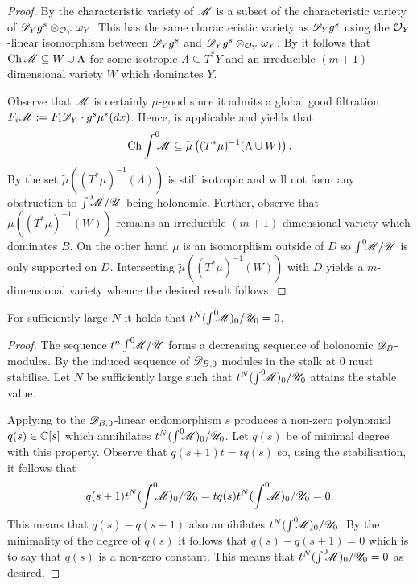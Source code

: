 \begin{proof}
  By  the characteristic variety of $\mathscr{M}$ is a subset of the characteristic variety of $\mathscr{D}_Yg^s \otimes_{\mathcal{O}_Y} \omega_Y$.
  This has the same characteristic variety as $\mathscr{D}_Y g^s$ using the $\mathcal{O}_Y$-linear isomorphism between $\mathscr{D}_Yg^s$ and $\mathscr{D}_Yg^s \otimes_{\mathcal{O}_Y} \omega_Y$.
  By  it follows that $\operatorname{Ch} \mathscr{M} \subseteq W \cup \Lambda$ for some isotropic $\Lambda\subseteq T^*Y$ and an irreducible $(m+1)$-dimensional variety $W$ which dominates $Y$.

  Observe that $\mathscr{M}$ is certainly $\mu$-good since it admits a global good filtration $F_i\mathscr{M} := F_i\mathscr{D}_Y \cdot g^s \mu^*(dx)$.
  Hence,  is applicable and yields that
  $$\operatorname{Ch} \int^0 \mkern -8mu \mathscr{M} \subseteq \widetilde{\mu}\left((T^*\mu)^{-1} (\Lambda \cup W)\right).$$
  By  the set $\widetilde{\mu}((T^*\mu)^{-1}(\Lambda))$ is still isotropic and will not form any obstruction to $\int^0 \mkern -8mu\mathscr{M}/\mathscr{U}$ being holonomic.
  Further, observe that $\widetilde{\mu}((T^*\mu)^{-1}(W))$ remains an irreducible $(m+1)$-dimensional variety which dominates $B$.
  On the other hand $\mu$ is an isomorphism outside of $D$ so $\int^0 \mkern -8mu\mathscr{M}/\mathscr{U}$ is only supported on $D$.
  Intersecting $\widetilde{\mu}((T^*\mu)^{-1}(W))$ with $D$ yields a $m$-dimensional variety whence the desired result follows.
\end{proof}
\begin{proposition}\label{prop: StableZero}
  For sufficiently large $N$ it holds that $t^N (\int^0 \mkern -8mu \mathscr{M})_0 / \mathscr{U}_0 = 0$.
\end{proposition}
\begin{proof}
  The sequence $t^n \int^0 \mkern -8mu\mathscr{M} / \mathscr{U}$ forms a decreasing sequence of holonomic $\mathscr{D}_B$-modules.
  By  the induced sequence of $\mathscr{D}_{B,0}$ modules in the stalk at $0$ must stabilise.
  Let $N$ be sufficiently large such that $t^N(\int^0 \mkern -8mu\mathscr{M})_0/\mathscr{U}_0$ attains the stable value.

  Applying  to the $\mathscr{D}_{B,0}$-linear endomorphism $s$ produces a non-zero polynomial $q(s)\in \mathbb{C}[s]$ which annihilates $t^N(\int^0 \mkern -8mu\mathscr{M})_0/\mathscr{U}_0$.
  Let $q(s)$ be of minimal degree with this property.
  Observe that $q(s+1)t = tq(s)$ so, using the stabilisation, it follows that
  $$q(s+1)t^N(\int^0 \mkern -8mu\mathscr{M})_0/\mathscr{U}_0 = t q(s) t^N(\int^0 \mkern -8mu\mathscr{M})_0/\mathscr{U}_0 = 0.$$
  This means that $q(s) - q(s+1)$ also annihilates $t^N(\int^0 \mkern -8mu\mathscr{M})_0/\mathscr{U}_0$.
  By the minimality of the degree of $q(s)$ it follows that $q(s) - q(s+1)=0$ which is to say that $q(s)$ is a non-zero constant.
  This means that $t^N(\int^0 \mkern -8mu\mathscr{M})_0/\mathscr{U}_0 = 0 $ as desired.
\end{proof}
